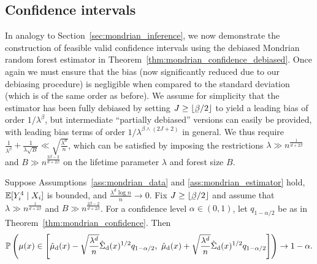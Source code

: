 \subsection{Confidence intervals}

In analogy to Section~\ref{sec:mondrian_inference},
we now demonstrate the construction of feasible valid confidence
intervals using the debiased Mondrian random forest estimator
in Theorem~\ref{thm:mondrian_confidence_debiased}.
Once again we must ensure that the bias
(now significantly reduced due to our debiasing procedure)
is negligible when compared to the standard deviation
(which is of the same order as before).
We assume for simplicity that the estimator has been fully
debiased by setting $J \geq \lfloor \flbeta / 2\rfloor$
to yield a leading bias of order $1/\lambda^\beta$,
but intermediate ``partially debiased'' versions can easily
be provided, with leading bias terms of order
$1/\lambda^{\beta \wedge (2J+2)}$ in general.
We thus require
$\frac{1}{\lambda^\beta} + \frac{1}{\lambda \sqrt B}
\ll \sqrt{\frac{\lambda^d}{n}}$,
which can be satisfied by imposing the restrictions
$\lambda \gg n^{\frac{1}{d + 2 \beta}}$
and $B \gg n^{\frac{2\beta - 2}{d + 2\beta}}$
on the lifetime parameter $\lambda$
and forest size $B$.

\begin{theorem}%
  \label{thm:mondrian_confidence_debiased}
  Suppose Assumptions~\ref{ass:mondrian_data} and \ref{ass:mondrian_estimator}
  hold,
  $\mathbb{E}[Y_i^4 \mid X_i ]$ is bounded,
  and $\frac{\lambda^d \log n}{n} \to 0$.
  Fix $J \geq \lfloor \flbeta / 2 \rfloor$ and assume that
  $\lambda \gg n^{\frac{1}{d + 2 \beta}}$
  and $B \gg n^{\frac{2 \beta - 2}{d + 2 \beta}}$.
  For a confidence level $\alpha \in (0, 1)$,
  let $q_{1 - \alpha / 2}$ be as in Theorem~\ref{thm:mondrian_confidence}. Then
  \begin{align*}
    \mathbb{P} \left(
      \mu(x) \in
      \left[
        \hat \mu_{\mathrm{d}}(x)
        - \sqrt{\frac{\lambda^d}{n}} \hat \Sigma_{\mathrm{d}}(x)^{1/2}
        q_{1 - \alpha / 2}, \
        \hat \mu_{\mathrm{d}}(x)
        + \sqrt{\frac{\lambda^d}{n}} \hat \Sigma_{\mathrm{d}}(x)^{1/2}
        q_{1 - \alpha / 2}
      \right]
    \right)
    \to
    1 - \alpha.
  \end{align*}

\end{theorem}


